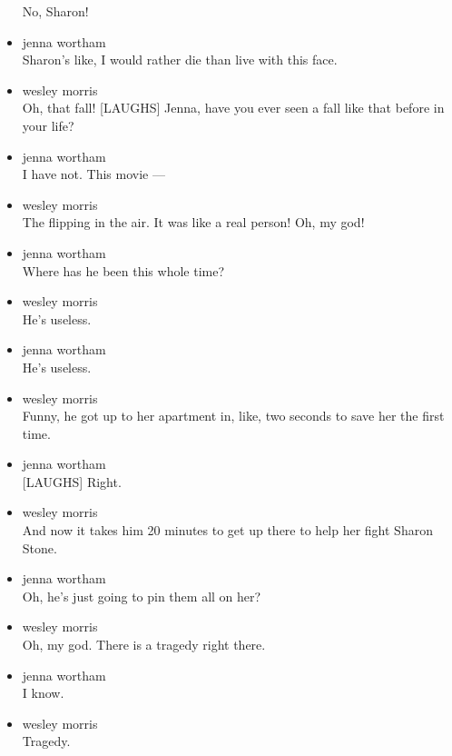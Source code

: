 \begin{itemize}
  No, Sharon!
\item
  jenna wortham\\
  Sharon's like, I would rather die than live with this face.
\item
  wesley morris\\
  Oh, that fall! {[}LAUGHS{]} Jenna, have you ever seen a fall like that
  before in your life?
\item
  jenna wortham\\
  I have not. This movie ---
\item
  wesley morris\\
  The flipping in the air. It was like a real person! Oh, my god!
\item
  jenna wortham\\
  Where has he been this whole time?
\item
  wesley morris\\
  He's useless.
\item
  jenna wortham\\
  He's useless.
\item
  wesley morris\\
  Funny, he got up to her apartment in, like, two seconds to save her
  the first time.
\item
  jenna wortham\\
  {[}LAUGHS{]} Right.
\item
  wesley morris\\
  And now it takes him 20 minutes to get up there to help her fight
  Sharon Stone.
\item
  jenna wortham\\
  Oh, he's just going to pin them all on her?
\item
  wesley morris\\
  Oh, my god. There is a tragedy right there.
\item
  jenna wortham\\
  I know.
\item
  wesley morris\\
  Tragedy.


\end{itemize}
